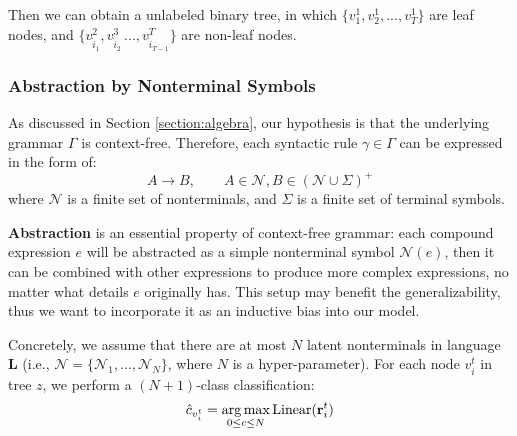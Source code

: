 \documentclass[11pt,a4paper]{article}
\begin{document}
Then we can obtain a unlabeled binary tree, in which $\{v_1^1, v_2^1, ..., v_T^1\}$ are leaf nodes, and $\{v_{\hat{i}_1}^2, v_{\hat{i}_2}^3\, ..., v_{\hat{i}_{T-1}}^{T}\}$ are non-leaf nodes.









\subsubsection{Abstraction by Nonterminal Symbols}\label{sec:REDUCE}

As discussed in Section \ref{section:algebra}, our hypothesis is that the underlying grammar $\Gamma$ is context-free.
Therefore, each syntactic rule $\gamma\in\Gamma$ can be expressed in the form of:
\begin{equation}
\nonumber
A\to B,\qquad A\in\mathcal{N}, B\in(\mathcal{N} \cup \Sigma)^+
\end{equation}
where $\mathcal{N}$ is a finite set of nonterminals, and $\Sigma$ is a finite set of terminal symbols.

\textbf{Abstraction} is an essential property of context-free grammar:
each compound expression $e$ will be abstracted as a simple nonterminal symbol $\mathcal{N}(e)$, then it can be combined with other expressions to produce more complex expressions, no matter what details $e$ originally has.
This setup may benefit the generalizability, thus we want to incorporate it as an inductive bias into our model.



Concretely, we assume that there are at most $N$ latent nonterminals in language $\mathbf{L}$ (i.e., $\mathcal{N}=\{\mathcal{N}_1,..., \mathcal{N}_N\}$, where $N$ is a hyper-parameter).
For each node $v_i^t$ in tree $z$, we perform a $(N+1)$-class classification:
\begin{equation}
\hat{c}_{v_i^t} = \mathop{\arg\max}_{0\leq c\leq N}\operatorname{Linear}(\mathbf{r}_i^t)\\
\end{equation}
\end{document}
